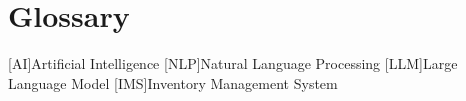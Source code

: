 \chapter{Glossary}

\footnotesize
\SingleSpacing

\begin{acronym}[AAAAAA]

	[AI]{Artificial Intelligence}
	[NLP]{Natural Language Processing}
	[LLM]{Large Language Model}
	[IMS]{Inventory Management System}

\end{acronym}

